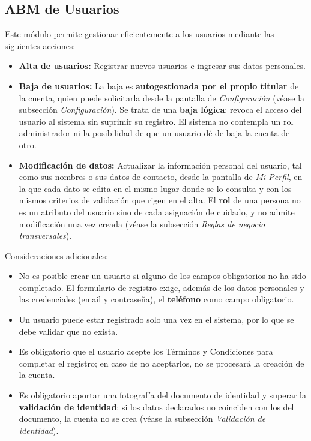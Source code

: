 \documentclass[a4paper,12pt]{article}
\begin{document}
    \subsection{ABM de Usuarios}
    \par Este módulo permite gestionar eficientemente a los usuarios mediante las siguientes acciones:
    \begin{itemize}
        \item \textbf{Alta de usuarios:} Registrar nuevos usuarios e ingresar sus datos personales.
        \item \textbf{Baja de usuarios:} La baja es \textbf{autogestionada por el propio titular} de la cuenta, quien puede solicitarla desde la pantalla de \textit{Configuración} (véase la subsección \textit{Configuración}). Se trata de una \textbf{baja lógica}: revoca el acceso del usuario al sistema sin suprimir su registro. El sistema no contempla un rol administrador ni la posibilidad de que un usuario dé de baja la cuenta de otro.
        \item \textbf{Modificación de datos:} Actualizar la información personal del usuario, tal como sus nombres o sus datos de contacto, desde la pantalla de \textit{Mi Perfil}, en la que cada dato se edita en el mismo lugar donde se lo consulta y con los mismos criterios de validación que rigen en el alta. El \textbf{rol} de una persona no es un atributo del usuario sino de cada asignación de cuidado, y no admite modificación una vez creada (véase la subsección \textit{Reglas de negocio transversales}).
    \end{itemize}
    \par Consideraciones adicionales:
    \begin{itemize}
        \item No es posible crear un usuario si alguno de los campos obligatorios no ha sido completado. El formulario de registro exige, además de los datos personales y las credenciales (email y contraseña), el \textbf{teléfono} como campo obligatorio.
        \item Un usuario puede estar registrado solo una vez en el sistema, por lo que se debe validar que no exista.
        \item Es obligatorio que el usuario acepte los Términos y Condiciones para completar el registro; en caso de no aceptarlos, no se procesará la creación de la cuenta.
        \item Es obligatorio aportar una fotografía del documento de identidad y superar la \textbf{validación de identidad}: si los datos declarados no coinciden con los del documento, la cuenta no se crea (véase la subsección \textit{Validación de identidad}).
    \end{itemize}
\end{document}
